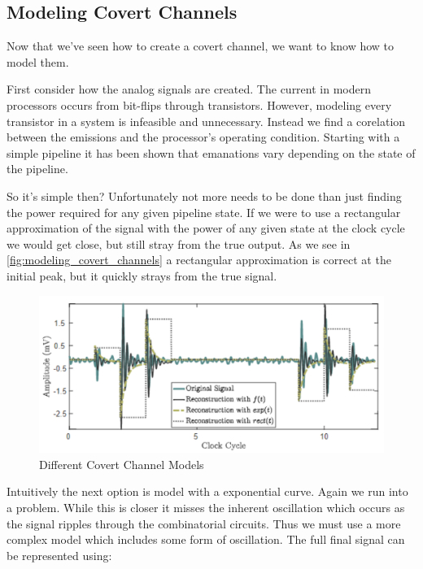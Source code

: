   \subsection{Modeling Covert Channels}
    Now that we've seen how to create a covert channel, we want to know how to model them.

    First consider how the analog signals are created.
    The current in modern processors occurs from bit-flips through transistors.
    However, modeling every transistor in a system is infeasible and unnecessary.
    Instead we find a corelation between the emissions and the processor's operating condition.
    Starting with a simple pipeline it has been shown that emanations vary depending on the state of the pipeline.

    So it's simple then?
    Unfortunately not more needs to be done than just finding the power required for any given pipeline state.
    If we were to use a rectangular approximation of the signal with the power of any given state at the clock cycle
      we would get close, but still stray from the true output.
    As we see in \autoref{fig:modeling_covert_channels} a rectangular approximation is correct at the initial peak,
      but it quickly strays from the true signal.

    \begin{figure}[ht]
      \label{fig:modeling_covert_channels}
      \centering
      \includegraphics[width=\linewidth]{modeling_covert_channels.PNG}
      \caption{Different Covert Channel Models}
    \end{figure}

    Intuitively the next option is model with a exponential curve.
    Again we run into a problem.
    While this is closer it misses the inherent oscillation which occurs as the signal ripples through the combinatorial circuits.
    Thus we must use a more complex model which includes some form of oscillation.
    The full final signal can be represented using:

